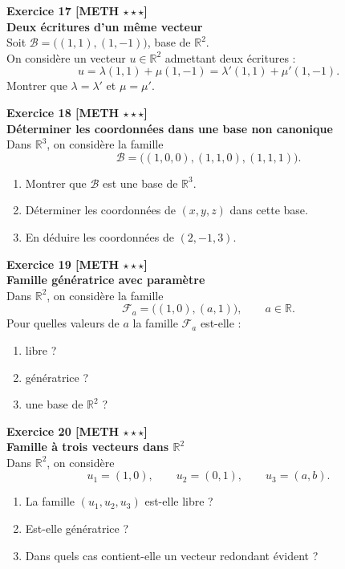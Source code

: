 \documentclass[11pt,a4paper]{article}
\begin{document}
\textbf{Exercice 17 [METH $\star\star\star$]}\\
\textbf{Deux écritures d’un même vecteur}\\
Soit \(\mathcal B=\big((1,1),(1,-1)\big)\), base de \(\mathbb{R}^2\).\\
On considère un vecteur \(u\in\mathbb{R}^2\) admettant deux écritures :
\[
u=\lambda(1,1)+\mu(1,-1)=\lambda'(1,1)+\mu'(1,-1).
\]
Montrer que \(\lambda=\lambda'\) et \(\mu=\mu'\).

\textbf{Exercice 18 [METH $\star\star\star$]}\\
\textbf{Déterminer les coordonnées dans une base non canonique}\\
Dans \(\mathbb{R}^3\), on considère la famille
\[
\mathcal B=\big((1,0,0),(1,1,0),(1,1,1)\big).
\]
\begin{enumerate}[label=\alph*)]
    \item Montrer que \(\mathcal B\) est une base de \(\mathbb{R}^3\).
    \item Déterminer les coordonnées de \((x,y,z)\) dans cette base.
    \item En déduire les coordonnées de \((2,-1,3)\).
\end{enumerate}

\textbf{Exercice 19 [METH $\star\star\star$]}\\
\textbf{Famille génératrice avec paramètre}\\
Dans \(\mathbb{R}^2\), on considère la famille
\[
\mathcal F_a=\big((1,0),(a,1)\big),\qquad a\in\mathbb{R}.
\]
Pour quelles valeurs de \(a\) la famille \(\mathcal F_a\) est-elle :
\begin{enumerate}[label=\alph*)]
    \item libre ?
    \item génératrice ?
    \item une base de \(\mathbb{R}^2\) ?
\end{enumerate}

\textbf{Exercice 20 [METH $\star\star\star$]}\\
\textbf{Famille à trois vecteurs dans \(\mathbb{R}^2\)}\\
Dans \(\mathbb{R}^2\), on considère
\[
u_1=(1,0),\qquad u_2=(0,1),\qquad u_3=(a,b).
\]
\begin{enumerate}[label=\alph*)]
    \item La famille \((u_1,u_2,u_3)\) est-elle libre ?
    \item Est-elle génératrice ?
    \item Dans quels cas contient-elle un vecteur redondant évident ?
\end{enumerate}
\end{document}
